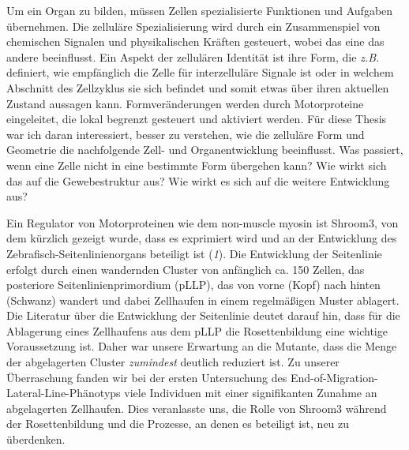 \documentclass[11pt,singlespacinge,twoside]{reedthesis} %
\theoremstyle{definition}
\theoremstyle{definition}
\theoremstyle{definition}
\theoremstyle{remark}
\begin{document}
Um ein Organ zu bilden, müssen Zellen spezialisierte Funktionen und Aufgaben übernehmen. Die zelluläre Spezialisierung wird durch ein Zusammenspiel von chemischen Signalen und physikalischen Kräften gesteuert, wobei das eine das andere beeinflusst. Ein Aspekt der zellulären Identität ist ihre Form, die \emph{z.B.} definiert, wie empfänglich die Zelle für interzelluläre Signale ist oder in welchem Abschnitt des Zellzyklus sie sich befindet und somit etwas über ihren aktuellen Zustand aussagen kann. Formveränderungen werden durch Motorproteine eingeleitet, die lokal begrenzt gesteuert und aktiviert werden. Für diese Thesis war ich daran interessiert, besser zu verstehen, wie die zelluläre Form und Geometrie die nachfolgende Zell- und Organentwicklung beeinflusst. Was passiert, wenn eine Zelle nicht in eine bestimmte Form übergehen kann? Wie wirkt sich das auf die Gewebestruktur aus? Wie wirkt es sich auf die weitere Entwicklung aus?

Ein Regulator von Motorproteinen wie dem non-muscle myosin ist Shroom3, von dem kürzlich gezeigt wurde, dass es exprimiert wird und an der Entwicklung des Zebrafisch-Seitenlinienorgans beteiligt ist (\emph{1}). Die Entwicklung der Seitenlinie erfolgt durch einen wandernden Cluster von anfänglich ca. 150 Zellen, das posteriore Seitenlinienprimordium (pLLP), das von vorne (Kopf) nach hinten (Schwanz) wandert und dabei Zellhaufen in einem regelmäßigen Muster ablagert. Die Literatur über die Entwicklung der Seitenlinie deutet darauf hin, dass für die Ablagerung eines Zellhaufens aus dem pLLP die Rosettenbildung eine wichtige Voraussetzung ist. Daher war unsere Erwartung an die Mutante, dass die Menge der abgelagerten Cluster \emph{zumindest} deutlich reduziert ist. Zu unserer Überraschung fanden wir bei der ersten Untersuchung des End-of-Migration-Lateral-Line-Phänotyps viele Individuen mit einer signifikanten Zunahme an abgelagerten Zellhaufen. Dies veranlasste uns, die Rolle von Shroom3 während der Rosettenbildung und die Prozesse, an denen es beteiligt ist, neu zu überdenken.
\end{document}
